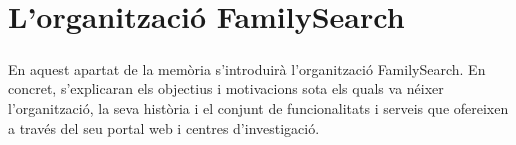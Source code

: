 \chapter{L'organització FamilySearch}
    \paragraph{}
    En aquest apartat de la memòria s'introduirà l’organització FamilySearch. En concret, s’explicaran els objectius i motivacions sota els quals va néixer l’organització, la seva història i el conjunt de funcionalitats i serveis que ofereixen a través del seu portal web i centres d’investigació.

    
    
    
    
    
    
    
    
